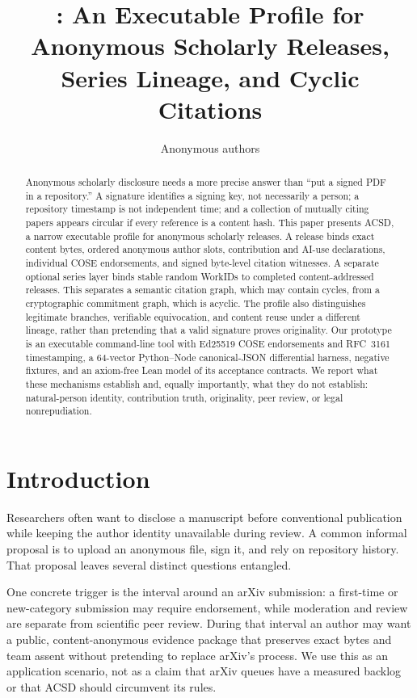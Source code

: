 \documentclass[11pt]{article}
\title{\acsd: An Executable Profile for Anonymous Scholarly Releases,\\ Series Lineage, and Cyclic Citations}
\author{Anonymous authors}
\date{}
\newcommand{\workid}{\textsf{WorkID}}
\newcommand{\acsd}{\textsc{ACSD}}
\begin{document}
\maketitle

\begin{abstract}
Anonymous scholarly disclosure needs a more precise answer than ``put a signed PDF in a repository.'' A signature identifies a signing key, not necessarily a person; a repository timestamp is not independent time; and a collection of mutually citing papers appears circular if every reference is a content hash. This paper presents \acsd, a narrow executable profile for anonymous scholarly releases. A release binds exact content bytes, ordered anonymous author slots, contribution and AI-use declarations, individual COSE endorsements, and signed byte-level citation witnesses. A separate optional series layer binds stable random \workid s to completed content-addressed releases. This separates a semantic citation graph, which may contain cycles, from a cryptographic commitment graph, which is acyclic. The profile also distinguishes legitimate branches, verifiable equivocation, and content reuse under a different lineage, rather than pretending that a valid signature proves originality. Our prototype is an executable command-line tool with Ed25519 COSE endorsements and RFC~3161 timestamping, a 64-vector Python--Node canonical-JSON differential harness, negative fixtures, and an axiom-free Lean model of its acceptance contracts. We report what these mechanisms establish and, equally importantly, what they do not establish: natural-person identity, contribution truth, originality, peer review, or legal nonrepudiation.
\end{abstract}

\section{Introduction}

Researchers often want to disclose a manuscript before conventional publication while keeping the author identity unavailable during review. A common informal proposal is to upload an anonymous file, sign it, and rely on repository history. That proposal leaves several distinct questions entangled.

One concrete trigger is the interval around an arXiv submission: a first-time or
new-category submission may require endorsement, while moderation and review
are separate from scientific peer review. During that interval an author may
want a public, content-anonymous evidence package that preserves exact bytes
and team assent without pretending to replace arXiv's process. We use this as
an application scenario, not as a claim that arXiv queues have a measured
backlog or that ACSD should circumvent its rules.
\end{document}
